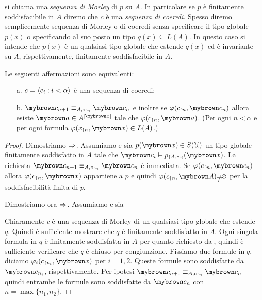 si chiama una \emph{sequenza di Morley\/} di $p$ su $A$. In particolare se $p$ \`e finitamente soddisfacibile in $A$ diremo che  $c$ \`e una \emph{sequenza di coeredi}. Spesso diremo semplicemente sequenza di Morley o di coeredi senza specificare il tipo globale $p(x)$ o specificando al suo posto un tipo $q(x)\subseteq L(A)$. In questo caso si intende che $p(x)$ \`e un qualsiasi tipo globale che estende $q(x)$ ed \`e invariante su $A$, rispettivamente, finitamente soddisfacibile in $A$. %

\begin{lemma}
Le seguenti affermazioni sono equivalenti:
\begin{itemize}
\item[a.] $c=\langle c_i:i<\alpha\rangle$ \`e una sequenza di coeredi;
\item[b.] ${\mr c_{n+1}}\equiv_{A,c_{\restriction n}} {\mr c_n}$ e inoltre se $\phi(c_{\restriction n},{\mr c_n})$  allora esiste ${\mr a}\in A^{|{\mr x}|}$ tale che $\phi(c_{\restriction n},{\mr a})$. (Per ogni $n<\alpha$ e per ogni formula $\phi(x_{\restriction n},{\mr x})\in L(A)$.)
\end{itemize}
\end{lemma}

\begin{proof}
Dimostriamo $\Rightarrow$. Assumiamo  e sia $p({\mr x})\in S(\U)$ un tipo globale finitamente soddisfatto in $A$ tale che ${\mr c_i}\models p_{\restriction A,c_{\restriction i}}({\mr x})$. La richiesta ${\mr c_{n+1}}\equiv_{A,c_{\restriction n}} {\mr c_n}$ \`e immediata. Se $\phi(c_{\restriction n},{\mr c_n})$ allora $\phi(c_{\restriction n},{\mr x})$ appartiene a $p$ e quindi $\phi(c_{\restriction n},{\mr A})\neq\0$ per la soddisfacibilit\`a finita di $p$.

Dimostriamo ora $\Rightarrow$. Assumiamo  e sia 


Chiaramente $c$ \`e una sequenza di Morley di un qualsiasi tipo globale che estende $q$. Quindi \`e sufficiente mostrare che $q$ \`e finitamente soddisfatto in $A$. Ogni singola formula in $q$ \`e finitamente soddisfatta in $A$ per quanto richiesto da , quindi \`e sufficiente verificare che $q$ \`e chiuso per congiunzione. Fissiamo due formule in $q$, diciamo $\phi_i(c_{\restriction n_i},{\mr x})$ per $i=1,2$. Queste formule sono soddisfatte da ${\mr c_{n_i}}$, rispettivamente. Per ipotesi ${\mr c_{n+1}}\equiv_{A,c_{\restriction n}}{\mr c_n}$ quindi entrambe le formule sono soddisfatte da ${\mr c_n}$ con $n=\max\{n_1,n_2\}$.
\end{proof}

